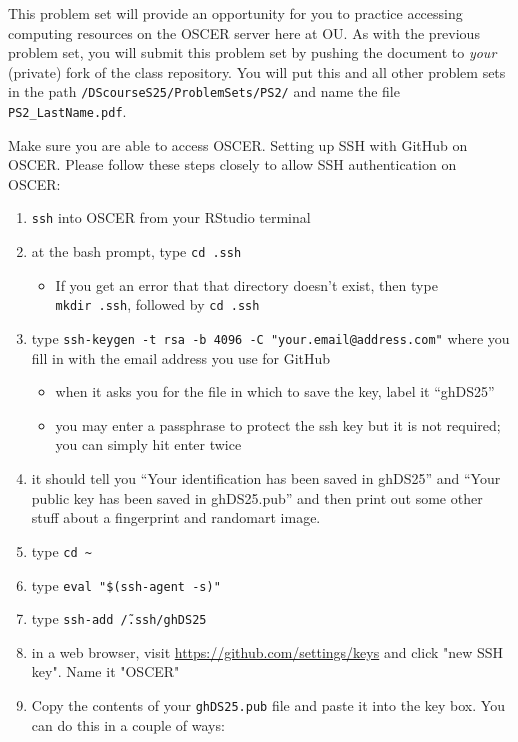 \documentclass[12pt,english]{exam}
\begin{document}
This problem set will provide an opportunity for you to practice accessing computing resources on the OSCER server here at OU.
As with the previous problem set, you will submit this problem set by pushing the document to \emph{your} (private) fork of the class repository. You will put this and all other problem sets in the path \texttt{/DScourseS25/ProblemSets/PS2/} and name the file \texttt{PS2\_LastName.pdf}.
\begin{questions}
\question Make sure you are able to access OSCER.
\question Setting up SSH with GitHub on OSCER.
Please follow these steps closely to allow SSH authentication on OSCER:
\begin{enumerate}
    \item \texttt{ssh} into OSCER from your RStudio terminal
    \item at the bash prompt, type \texttt{cd\ .ssh}
    \begin{itemize}
        \item If you get an error that that directory doesn't exist, then type \texttt{mkdir\ .ssh}, followed by \texttt{cd\ .ssh} 
    \end{itemize}
    \item type \texttt{ssh-keygen -t rsa -b 4096 -C "your.email@address.com"} where you fill in with the email address you use for GitHub
    \begin{itemize}
        \item when it asks you for the file in which to save the key, label it ``ghDS25''
        \item you may enter a passphrase to protect the ssh key but it is not required; you can simply hit enter twice
    \end{itemize}
    \item it should tell you ``Your identification has been saved in ghDS25'' and ``Your public key has been saved in ghDS25.pub'' and then print out some other stuff about a fingerprint and randomart image.
    \item type \texttt{cd \~}
    \item type \texttt{eval "\$(ssh-agent -s)"}
    \item type \texttt{ssh-add \~/.ssh/ghDS25}
    \item in a web browser, visit \url{https://github.com/settings/keys} and click "new SSH key". Name it "OSCER"
    \item Copy the contents of your \texttt{ghDS25.pub} file and paste it into the key box. You can do this in a couple of ways:
    \begin{itemize}

\end{itemize}
\end{enumerate}
\end{questions}
\end{document}
